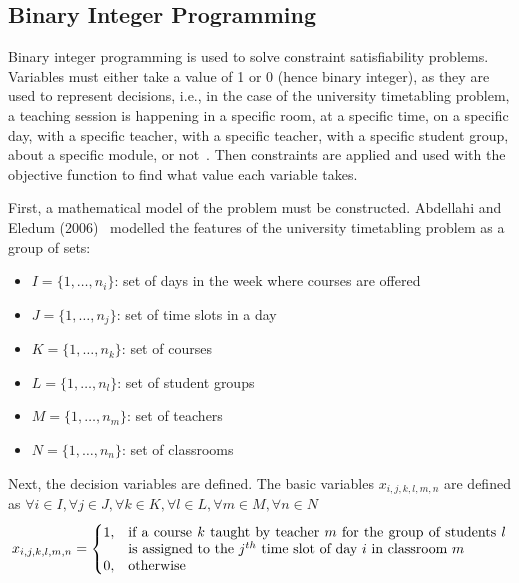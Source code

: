 \subsection{Binary Integer Programming}

Binary integer programming is used to solve constraint satisfiability problems.
Variables must either take a value of 1 or 0 (hence binary integer), as they 
are used to represent decisions, i.e., in the case of the university 
timetabling problem, a teaching session is happening in a specific room, at a 
specific time, on a specific day, with a specific teacher, with a specific 
teacher, with a specific student group, about a specific module, or 
not~\cite{bip_example}.
Then constraints are applied and used with the objective function to find what
value each variable takes.

First, a mathematical model of the problem must be constructed.
Abdellahi and Eledum (2006)~\cite{bip_example} modelled the features of the
university timetabling problem as a group of sets:
\begin{itemize}
	\item
		\begin{math}
			I = \{ 1, \dots , n_i \}
		\end{math}: set of days in the week where courses are offered
	\item
		\begin{math}
			J = \{ 1, \dots , n_j \}
		\end{math}: set of time slots in a day
	\item 
		\begin{math}
			K = \{ 1, \dots , n_k \}
		\end{math}: set of courses
	\item 
		\begin{math}
			L = \{ 1, \dots , n_l \}
		\end{math}: set of student groups
	\item 
		\begin{math}
			M = \{ 1, \dots , n_m \}
		\end{math}: set of teachers
	\item 
		\begin{math}
			N = \{ 1, \dots , n_n \}
		\end{math}: set of classrooms
\end{itemize}

Next, the decision variables are defined. The basic variables
\begin{math}
	x_{i,j,k,l,m,n}
\end{math}
are defined as
\begin{math}
	\forall i \in I, \forall j \in J, \forall k \in K, \forall l \in L, \forall
	m \in M, \forall n \in N
\end{math}
\begin{align*}
	x_{i,j,k,l,m,n} = 
	\begin{cases}
		1, & \parbox[t]{9.5cm}{if a course \( k \) taught by teacher \( m \) for
		the group of students \( l \) is assigned to the \( j^{th} \) time slot 
		of day \( i \) in classroom \( m \)} \\
		0, & \text{otherwise}
	\end{cases}
\end{align*}


